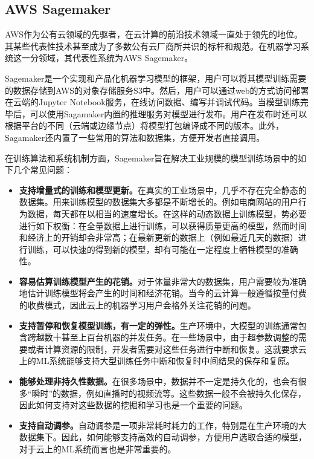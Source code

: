 \subsection{AWS Sagemaker}\label{subsec_sagemaker}
AWS作为公有云领域的先驱者，在云计算的前沿技术领域一直处于领先的地位。其某些代表性技术甚至成为了多数公有云厂商所共识的标杆和规范。在机器学习系统这一分领域，其代表性系统为AWS Sagemaker。

Sagemaker是一个实现和产品化机器学习模型的框架\parencite{joshi2020amazon}，用户可以将其模型训练需要的数据存储到AWS的对象存储服务S3中。然后，用户可以通过web的方式访问部署在云端的Jupyter Notebook服务，在线访问数据、编写并调试代码。当模型训练完毕后，可以使用Sagamaker内置的推理服务对模型进行发布。用户在发布时还可以根据平台的不同（云端或边缘节点）将模型打包编译成不同的版本。此外，Sagamaker还内置了一些常用的算法和数据集，方便开发者直接调用。

在训练算法和系统机制方面，Sagemaker旨在解决工业规模的模型训练场景中的如下几个常见问题：

\begin{itemize}
    \item \textbf{支持增量式的训练和模型更新。}在真实的工业场景中，几乎不存在完全静态的数据集。用来训练模型的数据集大多都是不断增长的。例如电商网站的用户行为数据，每天都在以相当的速度增长。在这样的动态数据上训练模型，势必要进行如下权衡：在全量数据上进行训练，可以获得质量更高的模型，然而时间和经济上的开销却会非常高；在最新更新的数据上（例如最近几天的数据）进行训练，可以快速的得到新的模型，却有可能在一定程度上牺牲模型的准确性。
    \item \textbf{容易估算训练模型产生的花销。}对于体量非常大的数据集，用户需要较为准确地估计训练模型将会产生的时间和经济花销。当今的云计算一般遵循按量付费的收费模式，因此云上的机器学习用户会格外关注花销的问题。
    \item \textbf{支持暂停和恢复模型训练，有一定的弹性。}生产环境中，大模型的训练通常包含跨越数十甚至上百台机器的并发任务。在一些场景中，由于超参数调整的需要或者计算资源的限制，开发者需要对这些任务进行中断和恢复。这就要求云上的ML系统能够支持大型训练任务中断和恢复时中间结果的保存和复原。
    \item \textbf{能够处理非持久性数据。}在很多场景中，数据并不一定是持久化的，也会有很多“瞬时”的数据，例如直播时的视频流等。这些数据一般不会被持久化保存，因此如何支持对这些数据的挖掘和学习也是一个重要的问题。
    \item \textbf{支持自动调参。}自动调参是一项非常耗时耗力的工作，特别是在生产环境的大数据集下。因此，如何能够支持高效的自动调参，方便用户选取合适的模型，对于云上的ML系统而言也是非常重要的。
\end{itemize}

